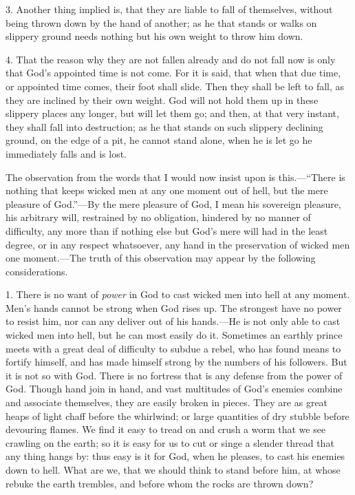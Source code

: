 \documentclass[
]{book}
\begin{document}
3. Another thing implied is, that they are liable to fall of themselves, without being thrown down by the hand of another; as he that stands or walks on slippery ground needs nothing but his own weight to throw him down.

4. That the reason why they are not fallen already and do not fall now is only that God's appointed time is not come. For it is said, that when that due time, or appointed time comes, their foot shall slide. Then they shall be left to fall, as they are inclined by their own weight. God will not hold them up in these slippery places any longer, but will let them go; and then, at that very instant, they shall fall into destruction; as he that stands on such slippery declining ground, on the edge of a pit, he cannot stand alone, when he is let go he immediately falls and is lost.

The observation from the words that I would now insist upon is this.---``There is nothing that keeps wicked men at any one moment out of hell, but the mere pleasure of God.''---By the mere pleasure of God, I mean his sovereign pleasure, his arbitrary will, restrained by no obligation, hindered by no manner of difficulty, any more than if nothing else but God's mere will had in the least degree, or in any respect whatsoever, any hand in the preservation of wicked men one moment.---The truth of this observation may appear by the following considerations.

1. There is no want of \emph{power} in God to cast wicked men into hell at any moment. Men's hands cannot be strong when God rises up. The strongest have no power to resist him, nor can any deliver out of his hands.---He is not only able to cast wicked men into hell, but he can most easily do it. Sometimes an earthly prince meets with a great deal of difficulty to subdue a rebel, who has found means to fortify himself, and has made himself strong by the numbers of his followers. But it is not so with God. There is no fortress that is any defense from the power of God. Though hand join in hand, and vast multitudes of God's enemies combine and associate themselves, they are easily broken in pieces. They are as great heaps of light chaff before the whirlwind; or large quantities of dry stubble before devouring flames. We find it easy to tread on and crush a worm that we see crawling on the earth; so it is easy for us to cut or singe a slender thread that any thing hangs by: thus easy is it for God, when he pleases, to cast his enemies down to hell. What are we, that we should think to stand before him, at whose rebuke the earth trembles, and before whom the rocks are thrown down?
\end{document}
